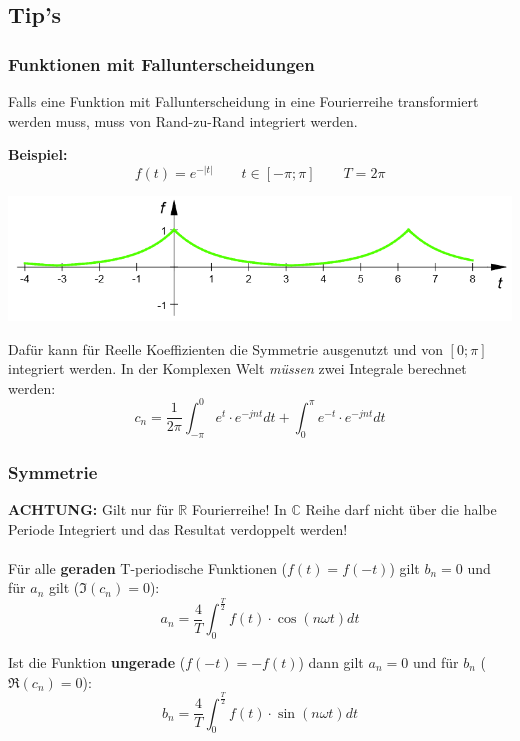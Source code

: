 \subsection{Tip's}\label{tip}
\subsubsection{Funktionen mit Fallunterscheidungen}
Falls eine Funktion mit Fallunterscheidung in eine Fourierreihe transformiert werden muss, muss von Rand-zu-Rand integriert werden.

\noindent\textbf{Beispiel:}
\[
f(t)= e^{-\left|t\right|} \qquad t \in [-\pi;\pi] \qquad T = 2\pi
\]
\begin{center}
	\includegraphics[width=0.6\columnwidth]{Images/beispiel_e_cn}
\end{center}

\noindent Dafür kann für Reelle Koeffizienten die Symmetrie ausgenutzt und von $[0;\pi]$ integriert werden. In der Komplexen Welt \textit{müssen} zwei Integrale berechnet werden:
\[
c_n = \frac{1}{2\pi}\int_{-\pi}^{0}e^t\cdot e^{-jnt}dt + \int_{0}^{\pi}e^{-t}\cdot e^{-jnt}dt
\]

\subsubsection{Symmetrie}
\textbf{ACHTUNG:} Gilt nur für $\mathbb{R}$ Fourierreihe! In $\mathbb{C}$ Reihe darf nicht über die halbe Periode Integriert und das Resultat verdoppelt werden! 
~\\
~\\
\noindent Für alle \textbf{geraden} T-periodische Funktionen ($f(t) = f(-t)$)  gilt $b_n = 0$ und für $a_n$ gilt ($\Im(c_n) = 0$): 
\[
a_n = \frac{4}{T}\int_{0}^{\frac{T}{2}}f(t) \cdot \cos(n\omega t)dt
\]

\noindent Ist die Funktion \textbf{ungerade} ($f(-t) = -f(t)$) dann gilt $a_n = 0$ und für $b_n$ ($\Re(c_n) = 0$):
\[
	b_n = \frac{4}{T}\int_{0}^{\frac{T}{2}}f(t) \cdot \sin(n\omega t)dt 
\]


